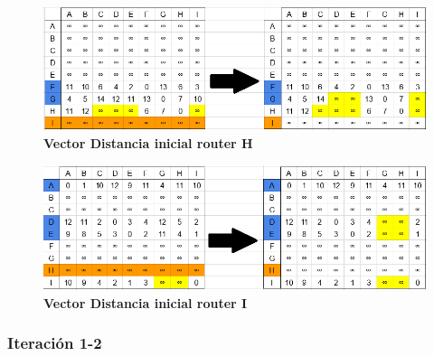 \documentclass[12pt]{article}
\begin{document}
\begin{figure}[H] 
\includegraphics[width=1\textwidth]{imagenes/3inicialH.png} \caption{\small \textbf{Vector Distancia inicial router H}}
\label{fig:diagrama_62} 
\end{figure}
\begin{figure}[H] 
\includegraphics[width=1\textwidth]{imagenes/3inicialI.png} \caption{\small \textbf{Vector Distancia inicial router I}}
\label{fig:diagrama_63} 
\end{figure}

\subsubsection{Iteración 1-2}
\end{document}
